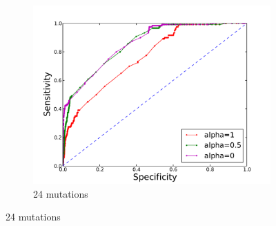 \begin{figure}
\begin{subfigure}[b]{0.3\textwidth}
\includegraphics[width=1.2\textwidth]{figures/ROC_24.pdf}
\caption{24 mutations}
\end{subfigure}
\end{figure}